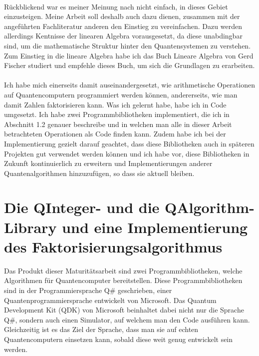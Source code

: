 \paragraph{}

Rückblickend war es meiner Meinung nach nicht einfach, in dieses Gebiet einzusteigen. Meine Arbeit soll deshalb auch dazu dienen, zusammen mit der angeführten Fachliteratur anderen den Einstieg zu vereinfachen. Dazu werden allerdings Kentnisse der linearen Algebra vorausgesetzt, da diese unabdingbar sind, um die mathematische Struktur hinter den Quantensystemen zu verstehen. Zum Einstieg in die lineare Algebra habe ich das Buch \grqq Lineare Algebra\grqq{} von Gerd Fischer \cite{LA} studiert und empfehle dieses Buch, um sich die Grundlagen zu erarbeiten.

\paragraph{}

Ich habe mich einerseits damit auseinandergesetzt, wie arithmetische Operationen auf Quantencomputern programmiert werden können, andererseits, wie man damit Zahlen faktorisieren kann. Was ich gelernt habe, habe ich in Code umgesetzt. Ich habe zwei Programmbibliotheken implementiert, die ich in Abschnitt 1.2 genauer beschreibe und in welchen man alle in dieser Arbeit betrachteten Operationen als Code finden kann.  Zudem habe ich bei der Implementierung gezielt darauf geachtet, dass diese Bibliotheken auch in späteren Projekten gut verwendet werden können und ich habe vor, diese Bibliotheken in Zukunft kontinuierlich zu erweitern und Implementierungen anderer Quantenalgorithmen hinzuzufügen, so dass sie aktuell bleiben. 

\section{Die QInteger- und die QAlgorithm-Library und eine Implementierung des Faktorisierungsalgorithmus}
Das Produkt dieser Maturitätsarbeit sind zwei Programmbibliotheken, welche Algorithmen für Quantencomputer bereitstellen. Diese Programmbibliotheken sind in der Programmiersprache Q\# geschrieben, einer Quantenprogrammiersprache entwickelt von Microsoft. Das Quantum Development Kit (QDK) von Microsoft beinhaltet dabei nicht nur die Sprache Q\#, sondern auch einen Simulator, auf welchem man den Code ausführen kann. Gleichzeitig ist es das Ziel der Sprache, dass man sie auf echten Quantencomputern einsetzen kann, sobald diese weit genug entwickelt sein werden.
